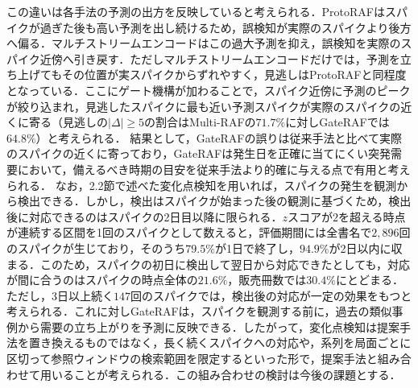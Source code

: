 \documentclass[twocolumn, lastpage]{jarticle}
\newif\ifrevmark
\newcommand{\revA}[1]{\ifrevmark{\color{blue}#1}\else#1\fi}
\begin{document}
この違いは各手法の予測の出方を反映していると考えられる．ProtoRAFはスパイクが過ぎた後も高い予測を出し続けるため，誤検知が実際のスパイクより後方へ偏る．マルチストリームエンコードはこの過大予測を抑え，誤検知を実際のスパイク近傍へ引き戻す．ただしマルチストリームエンコードだけでは，予測を立ち上げてもその位置が実スパイクからずれやすく，見逃しはProtoRAFと同程度となっている．ここにゲート機構が加わることで，スパイク近傍に予測のピークが絞り込まれ，\revA{見逃したスパイクに最も近い予測スパイクが実際のスパイクの近くに寄る（見逃しの$|\Delta| \geq 5$の割合はMulti-RAFの$71.7\%$に対しGateRAFでは$64.8\%$）}と考えられる．
結果として，\revA{GateRAFの誤りは従来手法と比べて実際のスパイクの近くに寄っており，GateRAFは}発生日を正確に当てにくい突発需要において，備えるべき時期の目安を\revA{従来手法より的確に}与える点で有用と考えられる．
\revA{なお，2.2節で述べた変化点検知を用いれば，スパイクの発生を観測から検出できる．しかし，検出はスパイクが始まった後の観測に基づくため，検出後に対応できるのはスパイクの2日目以降に限られる．$z$スコアが$2$を超える時点が連続する区間を1回のスパイクとして数えると，評価期間には全書名で$2{,}896$回のスパイクが生じており，そのうち$79.5\%$が1日で終了し，$94.9\%$が2日以内に収まる．このため，スパイクの初日に検出して翌日から対応できたとしても，対応が間に合うのはスパイクの時点全体の$21.6\%$，販売冊数では$30.4\%$にとどまる．ただし，3日以上続く$147$回のスパイクでは，検出後の対応が一定の効果をもつと考えられる．これに対しGateRAFは，スパイクを観測する前に，過去の類似事例から需要の立ち上がりを予測に反映できる．したがって，変化点検知は提案手法を置き換えるものではなく，長く続くスパイクへの対応や，系列を局面ごとに区切って参照ウィンドウの検索範囲を限定するといった形で，提案手法と組み合わせて用いることが考えられる．この組み合わせの検討は今後の課題とする．}
\end{document}
